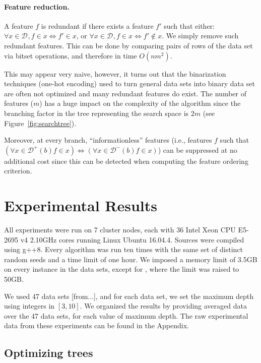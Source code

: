 \documentclass{llncs}
\def\posclass{+}
\def\negclass{-}
\def\datasymb{D}
\newcommand{\setex}[1]{\ensuremath{{\mathcal \datasymb}^{#1}}\xspace}
\newcommand{\posex}{{\setex{\posclass}}\xspace}
\newcommand{\negex}{{\setex{\negclass}}\xspace}
\newcommand{\allex}{{\setex{}}\xspace}
\newcommand{\afeat}[0]{\ensuremath{f}}
\newcommand{\abranch}[0]{\ensuremath{b}}
\newcommand{\numex}[0]{\ensuremath{n}}
\newcommand{\numfeat}[0]{\ensuremath{m}}
\begin{document}
\paragraph{Feature reduction.}

A feature $\afeat$ is redundant if there exists a feature $\afeat'$ such that either: $\forall x \in \allex, \afeat \in x \iff \afeat' \in x$, or $\forall x \in \allex, \afeat \in x \iff \afeat' \not\in x$. We simply remove such redundant features. This can be done by comparing pairs of rows of the data set via bitset operations, and therefore in time $O(\numex\numfeat^2)$.

This may appear very naive, however, it turns out that the binarization techniques (one-hot encoding) used to turn general data sets into binary data set are often not optimized and many redundant features do exist. The number of features ($\numfeat$) has a huge impact on the complexity of the algorithm since the branching factor in the tree representing the search space is $2\numfeat$ (see Figure~\ref{fig:searchtree}).

Moreover, at every branch, ``informationless'' features (i.e., features $\afeat$ such that $(\forall x \in \posex(\abranch) \afeat \in x) \iff (\forall x \in \negex(\abranch) \afeat \in x)$) can be suppressed at no additional cost since this can be detected when computing the feature ordering criterion.




\section{Experimental Results}

All experiments were run
on 7 cluster nodes, each with 36 Intel Xeon CPU E5-2695 v4 2.10GHz cores
running Linux Ubuntu 16.04.4. Sources were compiled using g++8. 
Every algorithm was run ten times with the same set of distinct random seeds and a time limit of one hour. We imposed a memory limit of 3.5GB on every instance in the data sets, except for \dleight, where the limit was raised to 50GB.

We used 47 data sets [from...], and for each data set, we set the maximum depth using integers in $[3,10]$. We organized the results by providing averaged data over the 47 data sets, for each value of maximum depth.
The raw experimental data from these experiments can be found in the Appendix.



\subsection{Optimizing trees}
\end{document}
